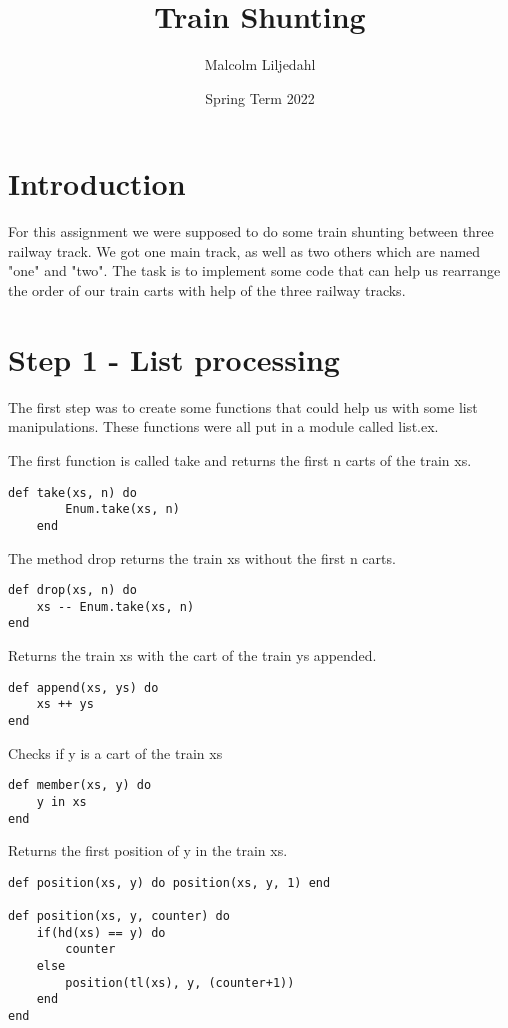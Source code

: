 \documentclass[a4paper,11pt]{article}
\begin{document}
\title{
    \textbf{Train Shunting}
}
\author{Malcolm Liljedahl}
\date{Spring Term 2022}

\maketitle

\section*{Introduction}
For this assignment we were supposed to do some train shunting between three railway track. We got one main track, as well as two others which are named "one" and "two". The task is to implement some code that can help us rearrange the order of our train carts with help of the three railway tracks. 

\section{Step 1 - List processing}
The first step was to create some functions that could help us with some list manipulations. These functions were all put in a module called list.ex.

The first function is called take and returns the first n carts of the train xs.
\begin{verbatim}
def take(xs, n) do
        Enum.take(xs, n)
    end
\end{verbatim}

The method drop returns the train xs without the first n carts.
 \begin{verbatim}  
def drop(xs, n) do
    xs -- Enum.take(xs, n)
end
\end{verbatim}

Returns the train xs with the cart of the train ys appended.
 \begin{verbatim}  
def append(xs, ys) do
    xs ++ ys
end
\end{verbatim}

Checks if y is a cart of the train xs
\begin{verbatim}  
def member(xs, y) do
    y in xs
end
\end{verbatim}

Returns the first position of y in the train xs.
\begin{verbatim}  
def position(xs, y) do position(xs, y, 1) end

def position(xs, y, counter) do
    if(hd(xs) == y) do
        counter
    else
        position(tl(xs), y, (counter+1))
    end
end
\end{verbatim}
\end{document}
